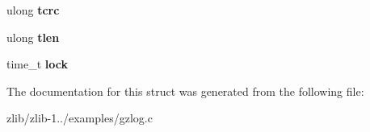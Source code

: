 \begin{DoxyCompactItemize}
\item 
\hypertarget{structlog_a79b1a158eeaf71d677243734dd475b8b}{ulong {\bfseries tcrc}}\label{structlog_a79b1a158eeaf71d677243734dd475b8b}

\item 
\hypertarget{structlog_a325d0cd98283f2a8012cf6f4bf3f2b34}{ulong {\bfseries tlen}}\label{structlog_a325d0cd98283f2a8012cf6f4bf3f2b34}

\item 
\hypertarget{structlog_a1db7776984d5005f5814ccfe47f2b1fd}{time\+\_\+t {\bfseries lock}}\label{structlog_a1db7776984d5005f5814ccfe47f2b1fd}

\end{DoxyCompactItemize}


The documentation for this struct was generated from the following file\+:\begin{DoxyCompactItemize}
\item 
zlib/zlib-\/1../examples/gzlog.\+c\end{DoxyCompactItemize}

